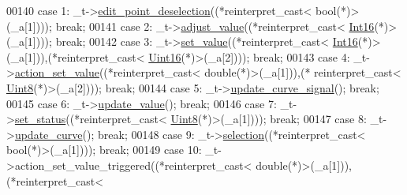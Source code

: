 \begin{DoxyCode}
00140         \textcolor{keywordflow}{case} 1: \_t->\hyperlink{a00008_a2b9629d20c2b97c01bf8486c89fd0148}{edit\_point\_deselection}((*\textcolor{keyword}{reinterpret\_cast<} \textcolor{keywordtype}{bool}(*)\textcolor{keyword}{>}(\_a[1]))); \textcolor{keywordflow}{
      break};
00141         \textcolor{keywordflow}{case} 2: \_t->\hyperlink{a00008_a74d292de22b341313df1852cb1033704}{adjust\_value}((*\textcolor{keyword}{reinterpret\_cast<} \hyperlink{a00004_a3985266aecb120f269789241c170850c}{Int16}(*)\textcolor{keyword}{>}(\_a[1]))); \textcolor{keywordflow}{break};
00142         \textcolor{keywordflow}{case} 3: \_t->\hyperlink{a00008_a9d26460f253a29dd961b20be0afb5358}{set\_value}((*\textcolor{keyword}{reinterpret\_cast<} \hyperlink{a00004_a3985266aecb120f269789241c170850c}{Int16}(*)\textcolor{keyword}{>}(\_a[1])),(*\textcolor{keyword}{reinterpret\_cast<} 
      \hyperlink{a00004_aae7407b021d43f7193a81a58cfb3e297}{Uint16}(*)\textcolor{keyword}{>}(\_a[2]))); \textcolor{keywordflow}{break};
00143         \textcolor{keywordflow}{case} 4: \_t->\hyperlink{a00008_a7c1fa0d7d1623b11d4badceb1854010e}{action\_set\_value}((*\textcolor{keyword}{reinterpret\_cast<} \textcolor{keywordtype}{double}(*)\textcolor{keyword}{>}(\_a[1])),(*\textcolor{keyword}{
      reinterpret\_cast<} \hyperlink{a00004_a979e3e23b9a449e69ab6a8a83b6042f8}{Uint8}(*)\textcolor{keyword}{>}(\_a[2]))); \textcolor{keywordflow}{break};
00144         \textcolor{keywordflow}{case} 5: \_t->\hyperlink{a00008_a7dfbddd62d6782b0f0ce809cbf2338ba}{update\_curve\_signal}(); \textcolor{keywordflow}{break};
00145         \textcolor{keywordflow}{case} 6: \_t->\hyperlink{a00008_ad5f20fdbb4731185020ff4e90cd1ead2}{update\_value}(); \textcolor{keywordflow}{break};
00146         \textcolor{keywordflow}{case} 7: \_t->\hyperlink{a00008_a9476424a86a6ed4f84c64d0ac77143cc}{set\_status}((*\textcolor{keyword}{reinterpret\_cast<} \hyperlink{a00004_a979e3e23b9a449e69ab6a8a83b6042f8}{Uint8}(*)\textcolor{keyword}{>}(\_a[1]))); \textcolor{keywordflow}{break};
00147         \textcolor{keywordflow}{case} 8: \_t->\hyperlink{a00008_a15cbcf5f0a17281468800f47898f60c1}{update\_curve}(); \textcolor{keywordflow}{break};
00148         \textcolor{keywordflow}{case} 9: \_t->\hyperlink{a00008_a86f994dedec393af88b5d1a37b1e30b5}{selection}((*\textcolor{keyword}{reinterpret\_cast<} \textcolor{keywordtype}{bool}(*)\textcolor{keyword}{>}(\_a[1]))); \textcolor{keywordflow}{break};
00149         \textcolor{keywordflow}{case} 10: \_t->action\_set\_value\_triggered((*\textcolor{keyword}{reinterpret\_cast<} \textcolor{keywordtype}{double}(*)\textcolor{keyword}{>}(\_a[1])),(*\textcolor{keyword}{reinterpret\_cast<} 

\end{DoxyCode}
